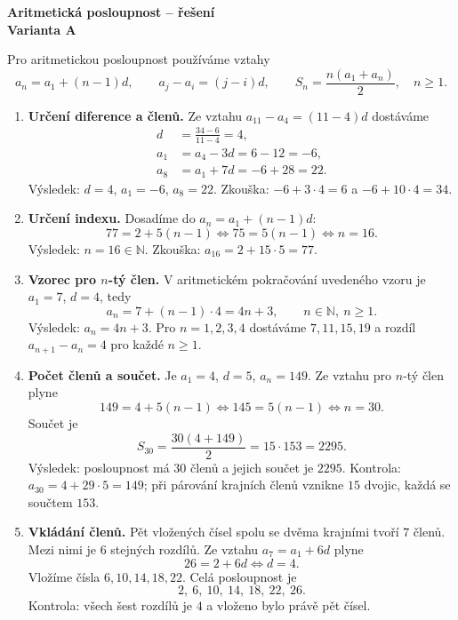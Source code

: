 \documentclass[a4paper,11pt]{article}
\begin{document}
\begin{center}
    {\Large\bfseries Aritmetická posloupnost -- řešení}\\[2mm]
    {\bfseries Varianta A}
\end{center}

Pro aritmetickou posloupnost používáme vztahy
\[
    a_n=a_1+(n-1)d,\qquad a_j-a_i=(j-i)d,\qquad
    S_n=\frac{n(a_1+a_n)}2,\quad n\ge1.
\]

\begin{enumerate}
    \item \textbf{Určení diference a členů.}
    Ze vztahu $a_{11}-a_4=(11-4)d$ dostáváme
    \begin{align*}
        d&=\frac{34-6}{11-4}=4,\\
        a_1&=a_4-3d=6-12=-6,\\
        a_8&=a_1+7d=-6+28=22.
    \end{align*}
    Výsledek: $d=4$, $a_1=-6$, $a_8=22$.
    Zkouška: $-6+3\cdot4=6$ a $-6+10\cdot4=34$.

    \item \textbf{Určení indexu.}
    Dosadíme do $a_n=a_1+(n-1)d$:
    \[
        77=2+5(n-1) \iff 75=5(n-1) \iff n=16.
    \]
    Výsledek: $n=16\in\mathbb N$.
    Zkouška: $a_{16}=2+15\cdot5=77$.

    \item \textbf{Vzorec pro $n$-tý člen.}
    V aritmetickém pokračování uvedeného vzoru je $a_1=7$, $d=4$, tedy
    \[
        a_n=7+(n-1)\cdot4=4n+3,\qquad n\in\mathbb N,\ n\ge1.
    \]
    Výsledek: $a_n=4n+3$.
    Pro $n=1,2,3,4$ dostáváme $7,11,15,19$ a rozdíl
    $a_{n+1}-a_n=4$ pro každé $n\ge1$.

    \item \textbf{Počet členů a součet.}
    Je $a_1=4$, $d=5$, $a_n=149$. Ze vztahu pro $n$-tý člen plyne
    \[
        149=4+5(n-1) \iff 145=5(n-1) \iff n=30.
    \]
    Součet je
    \[
        S_{30}=\frac{30(4+149)}2=15\cdot153=2295.
    \]
    Výsledek: posloupnost má $30$ členů a jejich součet je $2295$.
    Kontrola: $a_{30}=4+29\cdot5=149$; při párování krajních členů
    vznikne $15$ dvojic, každá se součtem $153$.

    \item \textbf{Vkládání členů.}
    Pět vložených čísel spolu se dvěma krajními tvoří $7$ členů.
    Mezi nimi je $6$ stejných rozdílů. Ze vztahu $a_7=a_1+6d$ plyne
    \[
        26=2+6d \iff d=4.
    \]
    Vložíme čísla $6,10,14,18,22$. Celá posloupnost je
    \[
        2,\ 6,\ 10,\ 14,\ 18,\ 22,\ 26.
    \]
    Kontrola: všech šest rozdílů je $4$ a vloženo bylo právě pět čísel.
\end{enumerate}
\end{document}

